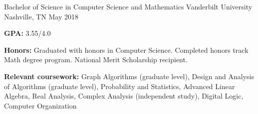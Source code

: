 
\begin{cventries}
  \cventry
    {Bachelor of Science in Computer Science and Mathematics} %
    {Vanderbilt University} %
    {Nashville, TN} %
    {May 2018} %
    {
      \begin{cvitems} %
      	\item{\textbf{GPA: } 3.55/4.0}
      	\item{\textbf{Honors:} Graduated with honors in Computer Science. Completed honors track Math degree program. National Merit Scholarship recipient.}
      	\item {\textbf{Relevant coursework:} Graph Algorithms (graduate level), Design and Analysis of Algorithms (graduate level), Probability and Statistics, Advanced Linear Algebra, Real Analysis, Complex Analysis (independent study), Digital Logic, Computer Organization}
      \end{cvitems}
    }
\end{cventries}
